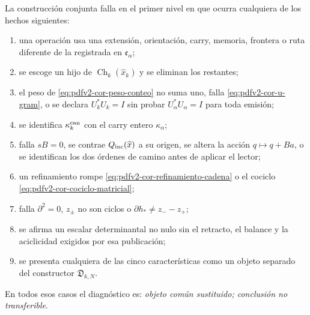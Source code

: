 \begin{criterion}
\label{crit:pdfv2-cor-falsadores}
La construcción conjunta falla en el primer nivel en que ocurra cualquiera de
los hechos siguientes:
\begin{enumerate}
 \item una operación usa una extensión, orientación, carry, memoria, frontera
 o ruta diferente de la registrada en \(\mathfrak e_\alpha\);
 \item se escoge un hijo de
 \(\operatorname{Ch}_k(\widehat x_k)\) y se eliminan los restantes;
 \item el peso de \eqref{eq:pdfv2-cor-peso-conteo} no suma uno, falla
 \eqref{eq:pdfv2-cor-u-gram}, o se declara \(U_k^*U_k=I\) sin probar
 \(U_\alpha^*U_\alpha=I\) para toda emisión;
 \item se identifica \(\kappa_k^{\rm can}\) con el carry entero
 \(\kappa_\alpha\);
 \item falla \(sB=0\), se contrae
 \(Q_{\rm inc}(\widehat x)\) a su origen, se altera la acción
 \(q\mapsto q+Ba\), o se identifican los dos órdenes de camino antes de
 aplicar el lector;
 \item un refinamiento rompe
 \eqref{eq:pdfv2-cor-refinamiento-cadena} o el cociclo
 \eqref{eq:pdfv2-cor-cociclo-matricial};
 \item falla \(\partial^2=0\), \(z_\pm\) no son ciclos o
 \(\partial h_*\neq z_--z_+\);
 \item se afirma un escalar determinantal no nulo sin el retracto, el
 balance y la aciclicidad exigidos por esa publicación;
 \item se presenta cualquiera de las cinco características como un objeto
 separado del constructor \(\mathfrak D_{k,N}\).
\end{enumerate}
En todos esos casos el diagnóstico es: \emph{objeto común sustituido;
conclusión no transferible}.
\end{criterion}

